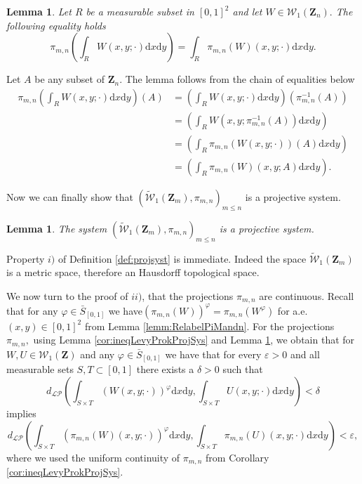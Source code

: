 \documentclass[12pt,twoside,a4paper]{article}
\newtheorem{lemma}[theorem]{Lemma}
\newcommand{\Space}{\mathbf{Z}}
\newcommand{\Graphon}{\mathcal{W}_1}
\newcommand{\UGraphon}{\widetilde{\mathcal{W}}_1}
\newcommand{\Relabel}{\bar{S}_{[0,1]}}
\begin{document}
\begin{lemma}\label{lemm:equal_pimProjSys}
Let $R$ be a measurable subset in $[0,1]^2$ and let $W\in \Graphon(\Space_n).$ The following equality holds
    \begin{equation*}
        \pi_{m,n}\left(\int_{R} W(x,y;\cdot) \mathrm{d}x \mathrm{d}y\right)=  \int_{R} \pi_{m,n}\left(W\right)(x,y;\cdot) \mathrm{d}x \mathrm{d}y.
    \end{equation*}
\end{lemma}
\proof
Let $A$ be any subset of $\Space_{n}.$ The lemma follows from the chain of equalities below
\begin{equation*}
\begin{aligned}
    \pi_{m,n}\left(\int_{R} W(x,y;\cdot) \mathrm{d}x \mathrm{d}y\right)(A)&=\left(\int_{R} W(x,y;\cdot) \mathrm{d}x \mathrm{d}y\right)(\pi^{-1}_{m,n}(A))\\&=\left(\int_{R} W(x,y;\pi^{-1}_{m,n}(A)) \mathrm{d}x \mathrm{d}y\right)\\
    &=\left(\int_{R} \pi_{m,n}\left(W(x,y;\cdot)\right)(A) \mathrm{d}x \mathrm{d}y\right)
    \\
    &=\left(\int_{R} \pi_{m,n}\left(W\right)(x,y;A) \mathrm{d}x \mathrm{d}y\right).
    \end{aligned}
\end{equation*}
\endproof

Now we can finally show that $(\UGraphon(\Space_m), \pi_{m,n})_{m \leq n}$ is a projective system.

\begin{lemma}\label{lemm:W1ProjSyst}
    The system $(\UGraphon(\Space_m), \pi_{m,n})_{m \leq n}$ is a projective system.
\end{lemma}
\proof
Property $i)$ of Definition \ref{def:projsyst} is immediate. Indeed the space $\UGraphon(\Space_m)$ is a metric space, therefore an Hausdorff topological space. 

We now turn to the proof of $ii)$, that the projections $\pi_{m,n}$ are continuous. 
Recall that for any $\varphi\in \Relabel$ we have$(\pi_{m,n}(W))^{\varphi}=\pi_{m,n}(W^{\varphi})$ for a.e.\ $(x,y)\in [0,1]^2$ from Lemma \ref{lemm:RelabelPiMandn}.
For the projections $\pi_{m,n},$ using  Lemma \ref{cor:ineqLevyProkProjSys} and Lemma \ref{lemm:equal_pimProjSys}, we obtain that for $W,U\in \Graphon(\Space)$ and any $\varphi\in \Relabel$ we have that for every $\varepsilon>0$ and all measurable sets $S,T\subset[0,1]$ there exists a $\delta>0$  such that 
\begin{equation*}
    d_\mathcal{LP}\left(\int_{S\times T}  (W(x,y;\cdot))^{\varphi} \mathrm{d}x \mathrm{d}y,\int_{S\times T} U(x,y;\cdot) \mathrm{d}x \mathrm{d}y\right)<\delta
\end{equation*}
implies \begin{equation*}
      d_\mathcal{LP}\left(\int_{S\times T}  (\pi_{m,n}\left(W\right)(x,y;\cdot))^{\varphi} \mathrm{d}x \mathrm{d}y,\int_{S\times T}  \pi_{m,n}\left(U\right)(x,y;\cdot) \mathrm{d}x \mathrm{d}y\right)<\varepsilon,
\end{equation*}
where we used the uniform continuity of $\pi_{m,n}$ from Corollary \ref{cor:ineqLevyProkProjSys}.
\end{document}
